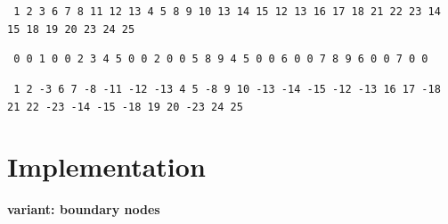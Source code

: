 {\tt
1 2 3 6 7 8 11 12 13
 4 5 8 9 10 13 14 15
 12 13 16 17 18 21 22 23
 14 15 18 19 20 23 24 25
}

{\tt
0 0 1 0 0 2 3 4 5
 0 0 2 0 0 5 8 9
 4 5 0 0 6 0 0 7
 8 9 6 0 0 7 0 0
}


{\tt
1 2 -3 6 7 -8 -11 -12 -13
 4 5 -8 9 10 -13 -14 -15
 -12 -13 16 17 -18 21 22 -23
 -14 -15 -18 19 20 -23 24 25
}


\section{Implementation}

{\bf variant: boundary nodes}

